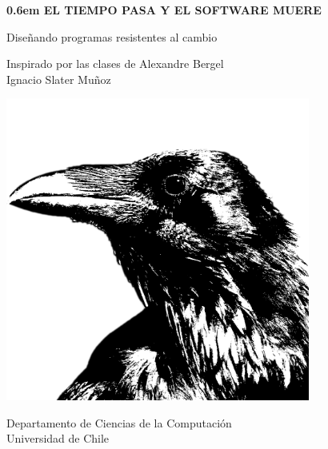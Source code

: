 \begin{titlepage}
  \clearpage
  \newcommand\nbvspace[1][3]{\vspace*{\stretch{#1}}}
  \newcommand\nbstretchyspace{\spaceskip0.5em plus 0.25em minus 0.25em}
  \newcommand{\nbtitlestretch}{\spaceskip0.6em}
  \pagestyle{empty}
  
  \begin{center}
    \bfseries
    \nbvspace[1]
    \Huge
    {
      \nbtitlestretch\huge
      EL TIEMPO PASA Y EL SOFTWARE MUERE
    }

    {\LARGE Diseñando programas resistentes al cambio}
    
    \nbvspace[1]
    \normalsize
    Inspirado por las clases de Alexandre Bergel
    \nbvspace[1]\\
    \Large Ignacio Slater Muñoz\\[0.5em]

    \nbvspace[2]

    \includegraphics[width=0.75\textwidth]{img/raven.jpg}
    \nbvspace[3]
    \normalsize

    Departamento de Ciencias de la Computación\\
    \large
    Universidad de Chile
    \nbvspace[1]
  \end{center}
\end{titlepage}